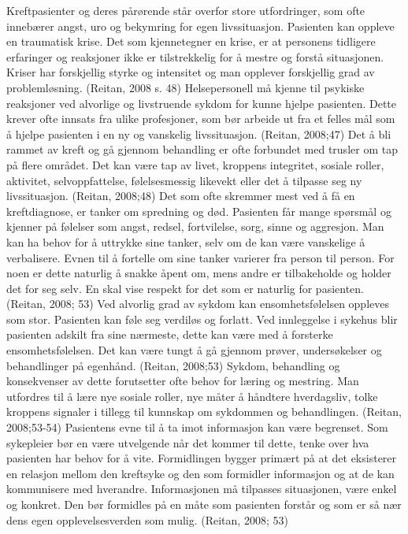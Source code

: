 Kreftpasienter og deres pårørende står overfor store utfordringer, som ofte
innebærer angst, uro og bekymring for egen livssituasjon. Pasienten kan oppleve
en traumatisk krise. Det som kjennetegner en krise, er at personens tidligere
erfaringer og reaksjoner ikke er tilstrekkelig for å mestre og forstå
situasjonen. Kriser har forskjellig styrke og intensitet og man opplever
forskjellig grad av problemløsning. (Reitan, 2008 s. 48) Helsepersonell må
kjenne til psykiske reaksjoner ved alvorlige og livstruende sykdom for kunne
hjelpe pasienten. Dette krever ofte innsats fra ulike profesjoner, som bør
arbeide ut fra et felles mål som å hjelpe pasienten i en ny og vanskelig
livssituasjon. (Reitan, 2008;47) Det å bli rammet av kreft og gå gjennom
behandling er ofte forbundet med trusler om tap på flere området. Det kan være
tap av livet, kroppens integritet, sosiale roller, aktivitet, selvoppfattelse,
følelsesmessig likevekt eller det å tilpasse seg ny livssituasjon. (Reitan,
2008;48) Det som ofte skremmer mest ved å få en kreftdiagnose, er tanker om
spredning og død. Pasienten får mange spørsmål og kjenner på følelser som
angst, redsel, fortvilelse, sorg, sinne og aggresjon. Man kan ha behov for å
uttrykke sine tanker, selv om de kan være vanskelige å verbalisere. Evnen til å
fortelle om sine tanker varierer fra person til person. For noen er dette
naturlig å snakke åpent om, mens andre er tilbakeholde og holder det for seg
selv. En skal vise respekt for det som er naturlig for pasienten. (Reitan,
2008; 53) Ved alvorlig grad av sykdom kan ensomhetsfølelsen oppleves som stor.
Pasienten kan føle seg verdiløs og forlatt. Ved innleggelse i sykehus blir
pasienten adskilt fra sine nærmeste, dette kan være med å forsterke
ensomhetsfølelsen. Det kan være tungt å gå gjennom prøver, undersøkelser og
behandlinger på egenhånd. (Reitan, 2008;53) Sykdom, behandling og konsekvenser
av dette forutsetter ofte behov for læring og mestring. Man utfordres til å
lære nye sosiale roller, nye måter å håndtere hverdagsliv, tolke kroppens
signaler i tillegg til kunnskap om sykdommen og behandlingen. (Reitan,
2008;53-54) Pasientens evne til å ta imot informasjon kan være begrenset. Som
sykepleier bør en være utvelgende når det kommer til dette, tenke over hva
pasienten har behov for å vite. Formidlingen bygger primært på at det
eksisterer en relasjon mellom den kreftsyke og den som formidler informasjon og
at de kan kommunisere med hverandre. Informasjonen må tilpasses situasjonen,
være enkel og konkret. Den bør formidles på en måte som pasienten forstår og
som er så nær dens egen opplevelsesverden som mulig. (Reitan, 2008; 53)

